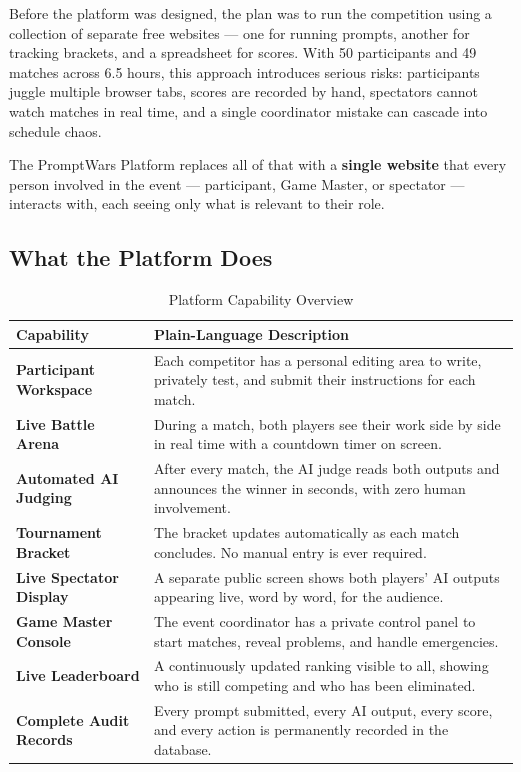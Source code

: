 \documentclass[11pt, a4paper]{article}
\begin{document}
Before the platform was designed, the plan was to run the competition using a collection of separate free websites --- one for running prompts, another for tracking brackets, and a spreadsheet for scores. With 50 participants and 49 matches across 6.5 hours, this approach introduces serious risks: participants juggle multiple browser tabs, scores are recorded by hand, spectators cannot watch matches in real time, and a single coordinator mistake can cascade into schedule chaos.

The PromptWars Platform replaces all of that with a \textbf{single website} that every person involved in the event --- participant, Game Master, or spectator --- interacts with, each seeing only what is relevant to their role.

\subsection{What the Platform Does}

\begin{table}[H]
\centering
\renewcommand{\arraystretch}{1.3}
\begin{tabularx}{\textwidth}{>{\bfseries}l X}
\toprule
Capability & Plain-Language Description \\
\midrule
Participant Workspace   & Each competitor has a personal editing area to write, privately test, and submit their instructions for each match. \\
Live Battle Arena       & During a match, both players see their work side by side in real time with a countdown timer on screen. \\
Automated AI Judging    & After every match, the AI judge reads both outputs and announces the winner in seconds, with zero human involvement. \\
Tournament Bracket      & The bracket updates automatically as each match concludes. No manual entry is ever required. \\
Live Spectator Display  & A separate public screen shows both players' AI outputs appearing live, word by word, for the audience. \\
Game Master Console     & The event coordinator has a private control panel to start matches, reveal problems, and handle emergencies. \\
Live Leaderboard        & A continuously updated ranking visible to all, showing who is still competing and who has been eliminated. \\
Complete Audit Records  & Every prompt submitted, every AI output, every score, and every action is permanently recorded in the database. \\
\bottomrule
\end{tabularx}
\caption{Platform Capability Overview}
\end{table}
\end{document}
